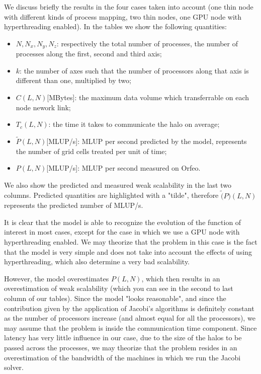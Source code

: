 \documentclass{article}
\begin{document}
We discuss briefly the results in the four cases taken into account (one thin node with different kinds of process mapping, two thin nodes, one GPU node with hyperthreading enabled). In the tables we show the following quantities:
\begin{itemize}
    \item $N, N_x, N_y, N_z$: respectively the total number of processes, the number of processes along the first, second and third axis;
    \item $k$: the number of axes such that the number of processors along that axis is different than one, multiplied by two;
    \item $C(L,N)$[MBytes]: the maximum data volume which transferrable on each node nework link;
    \item $T_c(L,N)$: the time it takes to communicate the halo on average;
    \item $\tilde{P}(L,N)$[MLUP/s]: MLUP per second predicted by the model, represents the number of grid cells treated per unit of time;
    \item $P(L,N)$[MLUP/s]: MLUP per second measured on Orfeo.
\end{itemize}

We also show the predicted and measured weak scalability in the last two columns. Predicted quantities are highlighted with a "tilde", therefore $\tilde(P)(L,N)$ represents the predicted number of MLUP/s.

It is clear that the model is able to recognize the evolution of the function of interest in most cases, except for the case in which we use a GPU node with hyperthreading enabled. We may theorize that the problem in this case is the fact that the model is very simple and does not take into account the effects of using hyperthreading, which also determine a very bad scalability.

However, the model overestimates $P(L,N)$, which then results in an overestimation of weak scalability (which you can see in the second to last column of our tables). Since the model "looks reasonable", and since the contribution given by the application of Jacobi's algorithms is definitely constant as the number of processors increase (and almost equal for all the processors), we may assume that the problem is inside the communication time component. Since latency has very little influence in our case, due to the size of the halos to be passed across the processes, we may theorize that the problem resides in an overestimation of the bandwidth of the machines in which we run the Jacobi solver.
\end{document}
